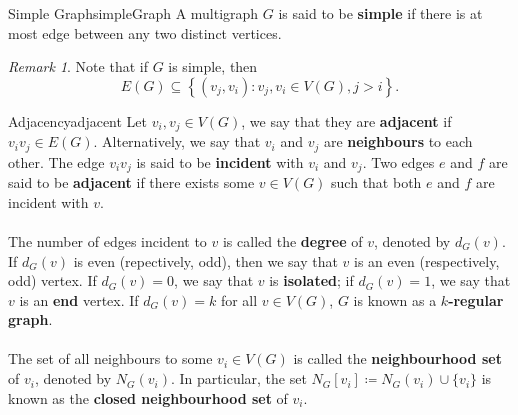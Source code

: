 \documentclass[math]{amznotes}
\theoremstyle{remark}
\newtheorem*{remark}{Remark}
\begin{document}
\begin{dfnbox}{Simple Graph}{simpleGraph}
    A multigraph $G$ is said to be {\color{red} \textbf{simple}} if there is at most edge between any two distinct vertices.
\end{dfnbox}
\begin{notebox}
    \begin{remark}
        Note that if $G$ is simple, then
        \begin{displaymath}
            E(G) \subseteq \left\{(v_j, v_i) \colon v_j, v_i \in V(G), j > i\right\}.
        \end{displaymath}
    \end{remark}
\end{notebox}
\begin{dfnbox}{Adjacency}{adjacent}
    Let $v_i, v_j \in V(G)$, we say that they are {\color{red} \textbf{adjacent}} if $v_iv_j \in E(G)$. Alternatively, we say that $v_i$ and $v_j$ are {\color{red} \textbf{neighbours}} to each other. The edge $v_iv_j$ is said to be {\color{red} \textbf{incident}} with $v_i$ and $v_j$. Two edges $e$ and $f$ are said to be {\color{red} \textbf{adjacent}} if there exists some $v \in V(G)$ such that both $e$ and $f$ are incident with $v$. 
    \\\\
    The number of edges incident to $v$ is called the {\color{red} \textbf{degree}} of $v$, denoted by $d_G(v)$. If $d_G(v)$ is even (repectively, odd), then we say that $v$ is an even (respectively, odd) vertex. If $d_G(v) = 0$, we say that $v$ is {\color{red} \textbf{isolated}}; if $d_G(v) = 1$, we say that $v$ is an {\color{red} \textbf{end}} vertex. If $d_G(v) = k$ for all $v \in V(G)$, $G$ is known as a {\color{red} \textbf{$k$-regular graph}}.
    \\\\
    The set of all neighbours to some $v_i \in V(G)$ is called the {\color{red} \textbf{neighbourhood set}} of $v_i$, denoted by $N_G(v_i)$. In particular, the set $N_G[v_i] \coloneqq N_G(v_i)\cup\{v_i\}$ is known as the {\color{red} \textbf{closed neighbourhood set}} of $v_i$.
\end{dfnbox}
\end{document}
